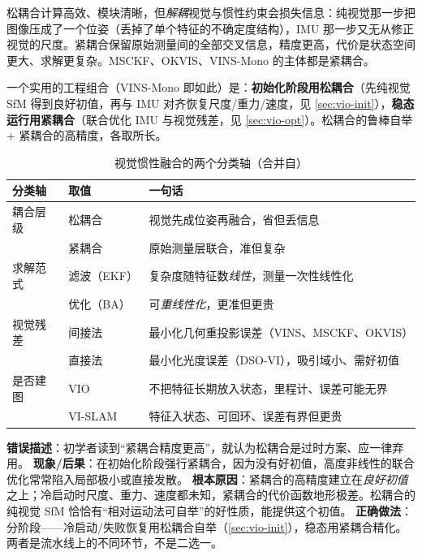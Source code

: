 松耦合计算高效、模块清晰，但\emph{解耦}视觉与惯性约束会损失信息\cite{huang2019vins}：纯视觉那一步把图像压成了一个位姿（丢掉了单个特征的不确定度结构），IMU 那一步又无从修正视觉的尺度。紧耦合保留原始测量间的全部交叉信息，精度更高，代价是状态空间更大、求解更复杂。MSCKF、OKVIS、VINS-Mono 的主体都是紧耦合。

\begin{insight}
一个实用的工程组合（VINS-Mono 即如此）是：\textbf{初始化阶段用松耦合}（先纯视觉 SfM 得到良好初值，再与 IMU 对齐恢复尺度/重力/速度，见 \cref{sec:vio-init}），\textbf{稳态运行用紧耦合}（联合优化 IMU 与视觉残差，见 \cref{sec:vio-opt}）。松耦合的鲁棒自举 $+$ 紧耦合的高精度，各取所长。
\end{insight}

\begin{table}[H]\centering\small
\caption{视觉惯性融合的两个分类轴（合并自\cite{huang2019vins,qin2018vins}）}
\label{tab:vio-taxonomy}
\begin{tabular}{lll}
\toprule
分类轴 & 取值 & 一句话 \\
\midrule
耦合层级 & 松耦合 & 视觉先成位姿再融合，省但丢信息 \\
         & 紧耦合 & 原始测量层联合，准但复杂 \\
求解范式 & 滤波（EKF） & 复杂度随特征数\emph{线性}，测量一次性线性化 \\
         & 优化（BA） & 可\emph{重线性化}，更准但更贵 \\
视觉残差 & 间接法 & 最小化几何重投影误差（VINS、MSCKF、OKVIS） \\
         & 直接法 & 最小化光度误差（DSO-VI），吸引域小、需好初值 \\
是否建图 & VIO & 不把特征长期放入状态，里程计、误差可能无界 \\
         & VI-SLAM & 特征入状态、可回环、误差有界但更贵 \\
\bottomrule
\end{tabular}
\end{table}

\begin{pitfall}
\textbf{错误描述}：初学者读到“紧耦合精度更高”，就认为松耦合是过时方案、应一律弃用。
\textbf{现象/后果}：在初始化阶段强行紧耦合，因为没有好初值，高度非线性的联合优化常常陷入局部极小或直接发散。
\textbf{根本原因}：紧耦合的高精度建立在\emph{良好初值}之上；冷启动时尺度、重力、速度都未知，紧耦合的代价函数地形极差。松耦合的纯视觉 SfM 恰恰有“相对运动法可自举”的好性质，能提供这个初值。
\textbf{正确做法}：分阶段——冷启动/失败恢复用松耦合自举（\cref{sec:vio-init}），稳态用紧耦合精化。两者是流水线上的不同环节，不是二选一。
\end{pitfall}

